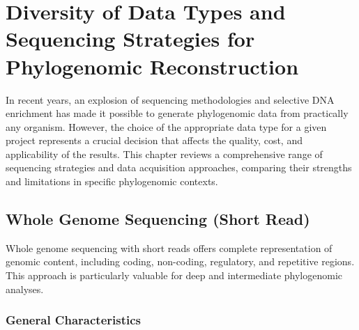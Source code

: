 \chapter{Diversity of Data Types and Sequencing Strategies for Phylogenomic Reconstruction}

In recent years, an explosion of sequencing methodologies and selective DNA enrichment has made it possible to generate phylogenomic data from practically any organism. However, the choice of the appropriate data type for a given project represents a crucial decision that affects the quality, cost, and applicability of the results. This chapter reviews a comprehensive range of sequencing strategies and data acquisition approaches, comparing their strengths and limitations in specific phylogenomic contexts.

\section{Whole Genome Sequencing (Short Read)}

Whole genome sequencing with short reads offers complete representation of genomic content, including coding, non-coding, regulatory, and repetitive regions. This approach is particularly valuable for deep and intermediate phylogenomic analyses.

\subsection{General Characteristics}

